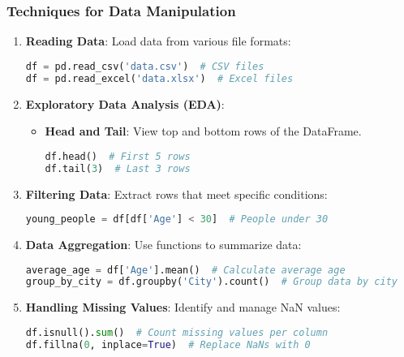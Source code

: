 \documentclass[aspectratio=169]{beamer}
\begin{document}
\begin{frame}[fragile]
    \frametitle{Techniques for Data Manipulation}
    \begin{enumerate}
        \item \textbf{Reading Data}:
            Load data from various file formats:
            \begin{lstlisting}[language=Python]
df = pd.read_csv('data.csv')  # CSV files
df = pd.read_excel('data.xlsx')  # Excel files
            \end{lstlisting}

        \item \textbf{Exploratory Data Analysis (EDA)}:
            \begin{itemize}
                \item \textbf{Head and Tail}: View top and bottom rows of the DataFrame.
                \begin{lstlisting}[language=Python]
df.head()  # First 5 rows
df.tail(3)  # Last 3 rows
                \end{lstlisting}
            \end{itemize}
         
        \item \textbf{Filtering Data}:
            Extract rows that meet specific conditions:
            \begin{lstlisting}[language=Python]
young_people = df[df['Age'] < 30]  # People under 30
            \end{lstlisting}
        
        \item \textbf{Data Aggregation}:
            Use functions to summarize data:
            \begin{lstlisting}[language=Python]
average_age = df['Age'].mean()  # Calculate average age
group_by_city = df.groupby('City').count()  # Group data by city
            \end{lstlisting}

        \item \textbf{Handling Missing Values}:
            Identify and manage NaN values:
            \begin{lstlisting}[language=Python]
df.isnull().sum()  # Count missing values per column
df.fillna(0, inplace=True)  # Replace NaNs with 0
            \end{lstlisting}
    \end{enumerate}
\end{frame}
\end{document}
